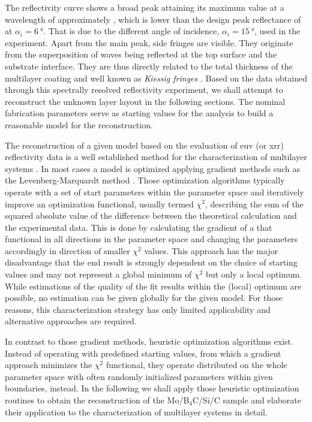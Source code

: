 The reflectivity curve shows a broad peak attaining its maximum value at a wavelength of approximately , which is lower than the design peak reflectance of  at $\alpha_i = \SI{6}{\degree}$. That is due to the different angle of incidence, $\alpha_i=\SI{15}{\degree}$, used in the experiment. Apart from the main peak, side fringes are visible. They originate from the superposition of waves being reflected at the top surface and the substrate interface. They are thus directly related to the total thickness of the multilayer coating and well known as \emph{Kiessig fringes} \cite{kiessig_interferenz_1931}. Based on the data obtained through this spectrally resolved reflectivity experiment, we shall attempt to reconstruct the unknown layer layout in the following sections. The nominal fabrication parameters serve as starting values for the analysis to build a reasonable model for the reconstruction.

The reconstruction of a given model based on the evaluation of \gls{euv} (or \gls{xrr}) reflectivity data is a well established method for the characterization of multilayer systems  \cite{lim_fabrication_2001, bajt_investigation_2001, braun_mo/si_2002}. In most cases a model is optimized applying gradient methods such as the Levenberg-Marquardt method \cite{levenberg_method_1944, marquardt_algorithm_1963}. Those optimization algorithms typically operate with a set of start parameters within the parameter space and iteratively improve an optimization functional, usually termed $\chi^2$, describing the sum of the squared absolute value of the difference between the theoretical calculation and the experimental data. This is done by calculating the gradient of a that functional in all directions in the parameter space and changing the parameters accordingly in direction of smaller $\chi^2$ values. This approach has the major disadvantage that the end result is strongly dependent on the choice of starting values and may not represent a global minimum of $\chi^2$ but only a local optimum. While estimations of the quality of the fit results within the (local) optimum are possible, no estimation can be given globally for the given model. For those reasons, this characterization strategy has only limited applicability and alternative approaches are required.

In contrast to those gradient methods, heuristic optimization algorithms exist. Instead of operating with predefined starting values, from which a gradient approach minimizes the $\chi^2$ functional, they operate distributed on the whole parameter space with often randomly initialized parameters within given boundaries, instead. In the following we shall apply those heuristic optimization routines to obtain the reconstruction of the Mo/B$_4$C/Si/C sample and elaborate their application to the characterization of multilayer systems in detail.

